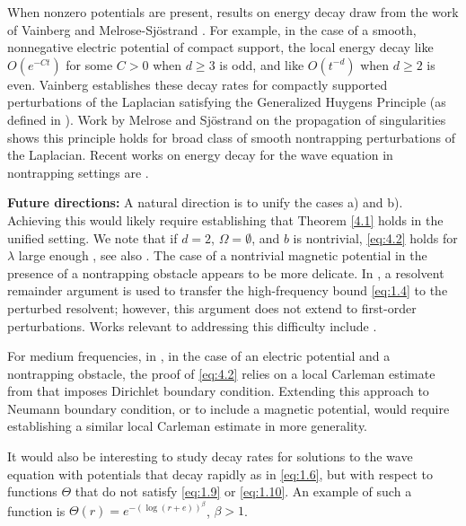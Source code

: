 \documentclass[11pt]{amsart}
\numberwithin{equation}{section}
\begin{document}
When nonzero potentials are present, results on energy decay draw from the work of Vainberg \cite{kn:Va} and Melrose-Sj\"ostrand \cite{kn:MS1, kn:MS2}. For example, in the case of a smooth, nonnegative electric potential of compact support, the local energy decay like $O(e^{-Ct})$ for some $C > 0$ when $d \ge 3$ is odd, and like $O(t^{-d})$ when $d \ge 2$ is even. Vainberg \cite{kn:Va, kn:Va1} establishes these decay rates for compactly supported perturbations of the Laplacian satisfying the Generalized Huygens Principle (as defined in \cite{kn:V2a}). Work by Melrose and Sj\"ostrand on the propagation of singularities \cite{kn:MS1, kn:MS2} shows this principle holds for broad class of smooth nontrapping perturbations of the Laplacian. Recent works on energy decay for the wave equation in nontrapping settings are \cite{kn:V1, kn:B1, kn:V1a, kn:V2, kn:BB, kn:CDY, kn:llst25}.


\textbf{Future directions:} A natural direction is to unify the cases a) and b). Achieving this would likely require establishing that Theorem \ref{4.1} holds in the unified setting. We note that if $d = 2$, $\Omega = \emptyset$, and $b$ is nontrivial, \eqref{eq:4.2} holds for $\lambda$ large enough \cite[Theorem 1.1]{kn:MPS}, see also \cite{kn:V3, kn:V5}.  The case of a nontrivial magnetic potential in the presence of a nontrapping obstacle appears to be more delicate. In \cite{kn:LSV}, a resolvent remainder argument is used to transfer the high-frequency bound \eqref{eq:1.4} to the perturbed resolvent; however, this argument does not extend to first-order perturbations. Works relevant to addressing this difficulty include \cite{kn:EGS, kn:CDL, kn:CDL2}.

For medium frequencies, in \cite{kn:LSV}, in the case of an electric potential and a nontrapping obstacle, the proof of \eqref{eq:4.2} relies on a local Carleman estimate from \cite{kn:V4} that imposes Dirichlet boundary condition. Extending this approach to Neumann boundary condition, or to include a magnetic potential, would require establishing a similar local Carleman estimate in more generality.

It would also be interesting to study decay rates for solutions to the wave equation with potentials that decay rapidly as in \eqref{eq:1.6}, but with respect to functions $\Theta$ that do not satisfy \eqref{eq:1.9} or \eqref{eq:1.10}. An example of such a function is $\Theta(r) = e^{-(\log(r + e))^\beta}$, $\beta > 1$.
\end{document}
